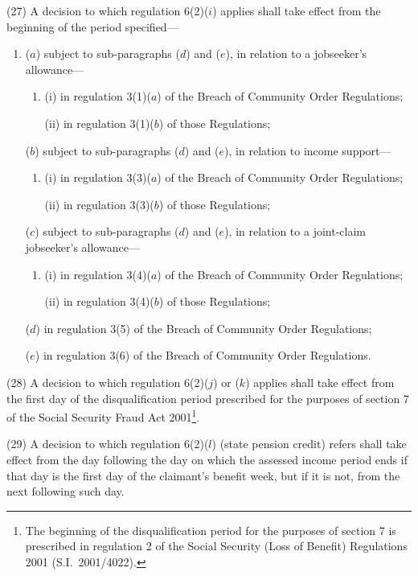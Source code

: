 \documentclass[12pt,a4paper]{article}
\begin{document}
(27) A decision to which regulation 6(2)($i$) applies shall take effect from the beginning of the period specified—
\begin{enumerate}\item[]
($a$) subject to sub-paragraphs ($d$)  and ($e$), in relation to a jobseeker’s allowance—
\begin{enumerate}\item[]
(i) in regulation 3(1)($a$)  of the Breach of Community Order Regulations;

(ii) in regulation 3(1)($b$)  of those Regulations;
\end{enumerate}

($b$) subject to sub-paragraphs ($d$)  and ($e$), in relation to income support—
\begin{enumerate}\item[]
(i) in regulation 3(3)($a$)  of the Breach of Community Order Regulations;

(ii) in regulation 3(3)($b$)  of those Regulations;
\end{enumerate}

($c$) subject to sub-paragraphs ($d$)  and ($e$), in relation to a joint-claim jobseeker’s allowance—
\begin{enumerate}\item[]
(i) in regulation 3(4)($a$)  of the Breach of Community Order Regulations;

(ii) in regulation 3(4)($b$)  of those Regulations;
\end{enumerate}

($d$) in regulation 3(5) of the Breach of Community Order Regulations;

($e$) in regulation 3(6) of the Breach of Community Order Regulations.
\end{enumerate}

(28) A decision to which regulation 6(2)($j$)  or ($k$)  applies shall take effect from the first day of the disqualification period prescribed for the purposes of section 7 of the Social Security Fraud Act 2001\footnote{The beginning of the disqualification period for the purposes of section 7 is prescribed in regulation 2 of the Social Security (Loss of Benefit) Regulations 2001 (S.I.\ 2001/4022).}.

(29) A decision to which regulation 6(2)($l$) (state pension credit) refers shall take effect from the day following the day on which the assessed income period ends if that day is the first day of the claimant’s benefit week, but if it is not, from the next following such day.
\end{document}
